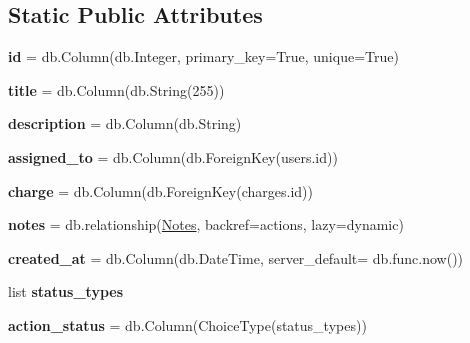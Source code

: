 \subsection*{Static Public Attributes}
\begin{DoxyCompactItemize}
\item 
\mbox{\label{classapp_1_1actions_1_1models_1_1_actions_ad5102328491b54276b56c31d1f222f0c}} 
{\bfseries id} = db.\+Column(db.\+Integer, primary\+\_\+key=True, unique=True)
\item 
\mbox{\label{classapp_1_1actions_1_1models_1_1_actions_ad48ceed71ad831eb40c92f862d829c79}} 
{\bfseries title} = db.\+Column(db.\+String(255))
\item 
\mbox{\label{classapp_1_1actions_1_1models_1_1_actions_a88fa96fe039a99483fa24bdcef4d3326}} 
{\bfseries description} = db.\+Column(db.\+String)
\item 
\mbox{\label{classapp_1_1actions_1_1models_1_1_actions_a9a101aea1ba6da349bdfc95385c02f67}} 
{\bfseries assigned\+\_\+to} = db.\+Column(db.\+Foreign\+Key(\textquotesingle{}users.\+id\textquotesingle{}))
\item 
\mbox{\label{classapp_1_1actions_1_1models_1_1_actions_a3e430c7d110773a03facd6e7284a6512}} 
{\bfseries charge} = db.\+Column(db.\+Foreign\+Key(\textquotesingle{}charges.\+id\textquotesingle{}))
\item 
\mbox{\label{classapp_1_1actions_1_1models_1_1_actions_af92e45f68009abdced71b9bb2f71a71b}} 
{\bfseries notes} = db.\+relationship(\textquotesingle{}\mbox{\hyperlink{classapp_1_1notes_1_1models_1_1_notes}{Notes}}\textquotesingle{}, backref=\textquotesingle{}actions\textquotesingle{}, lazy=\textquotesingle{}dynamic\textquotesingle{})
\item 
\mbox{\label{classapp_1_1actions_1_1models_1_1_actions_a5d28004f4e6b3a38da8d522b3a984070}} 
{\bfseries created\+\_\+at} = db.\+Column(db.\+Date\+Time, server\+\_\+default= db.\+func.\+now())
\item 
list {\bfseries status\+\_\+types}
\item 
\mbox{\label{classapp_1_1actions_1_1models_1_1_actions_aec5f6fed0f4febda1e7dd3ac45af5026}} 
{\bfseries action\+\_\+status} = db.\+Column(Choice\+Type(status\+\_\+types))
\end{DoxyCompactItemize}


